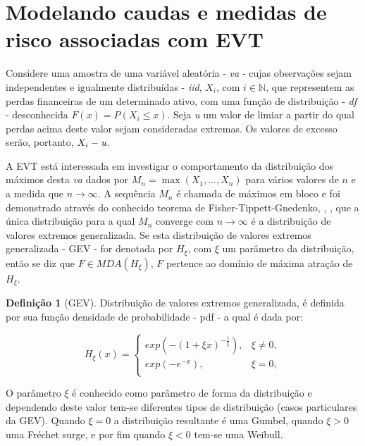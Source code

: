 \documentclass[1p]{elsarticle}
\theoremstyle{definition}
\newtheorem{defi}[teor]{Definição}
\begin{document}
\section{Modelando caudas e medidas de risco associadas com EVT}
\label{sec:caudas}

Considere uma amostra de uma variável aleatória - \emph{va} - cujas observações sejam independentes e igualmente distribuídas - \emph{iid}, $X_i$, com $i\in \mathbb{N}$, que representem as perdas financeiras de um determinado ativo, com uma função de distribuição - \emph{df} - desconhecida $F(x) = P(X_i \leq x)$.
Seja \emph{u} um valor de limiar a partir do qual perdas acima deste valor sejam consideradas extremas. Os valores de excesso serão, portanto, $X_i - \emph{u}$.

A EVT está interessada em investigar o comportamento da distribuição dos máximos desta \emph{va} dados por $M_n = \max (X_1, \ldots , X_n)$ para vários valores de $n$ e a medida que $n\rightarrow \infty$. A sequência $M_n$ é chamada de máximos em bloco e foi demonstrado através do conhecido teorema de Fisher-Tippett-Gnedenko, \cite{Fisher1928}, \cite{Gnedenko1941, Gnedenko1943}, que a única distribuição para a qual $M_n$ converge com $n\rightarrow \infty$ é a distribuição de valores extremos generalizada. Se esta distribuição de valores extremos generalizada - GEV - for denotada por $H_\xi$, com $\xi$ um parâmetro da distribuição, então se diz que $F \in MDA(H_\xi)$, $F$ pertence ao domínio de máxima atração de $H_\xi$.


\begin{defi}[GEV] \label{defi:GEV}
	Distribuição de valores extremos generalizada, é definida por sua função densidade de probabilidade - pdf - a qual é dada por:
	
	\begin{equation}
	\label{eq:GEV}
	H_\xi(x) = 
	\begin{cases}
	exp(-(1+\xi x)^{-\frac{1}{\xi}}), & \xi \neq 0,\\
	exp(-e^{-x}), & \xi = 0,\\
	\end{cases}
	\end{equation}
\end{defi}

O parâmetro $\xi$ é conhecido como parâmetro de forma da distribuição e dependendo deste valor tem-se diferentes tipos de distribuição (casos particulares da GEV). Quando $\xi=0$ a distribuição resultante é uma Gumbel, quando  $\xi>0$ uma Fréchet surge, e por fim quando $\xi<0$ tem-se uma Weibull.
\end{document}
